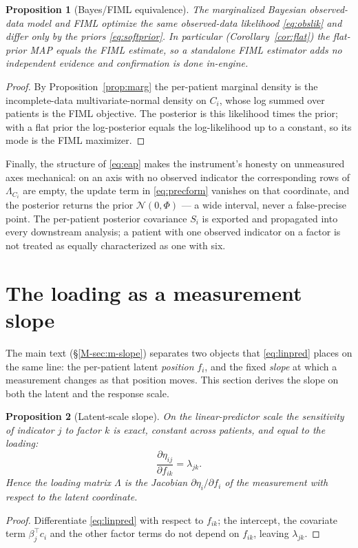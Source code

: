 \documentclass[11pt]{article}
\theoremstyle{plain}
\newtheorem{proposition}{Proposition}
\theoremstyle{definition}
\newcommand{\MSec}[1]{\S\ref{M-#1}}
\begin{document}
\begin{proposition}[Bayes/FIML equivalence]\label{prop:fiml}
The marginalized Bayesian observed-data model and FIML optimize the same observed-data
likelihood \eqref{eq:obslik} and differ only by the priors \eqref{eq:softprior}. In
particular (Corollary~\ref{cor:flat}) the flat-prior MAP equals the FIML estimate, so a
standalone FIML estimator adds no independent evidence and confirmation is done in-engine.
\end{proposition}
\begin{proof}
By Proposition~\ref{prop:marg} the per-patient marginal density is the incomplete-data
multivariate-normal density on $C_i$, whose log summed over patients is the FIML objective.
The posterior is this likelihood times the prior; with a flat prior the log-posterior equals
the log-likelihood up to a constant, so its mode is the FIML maximizer.
\end{proof}
\noindent
Finally, the structure of \eqref{eq:eap} makes the instrument's honesty on unmeasured axes
mechanical: on an axis with no observed indicator the corresponding rows of $\Lambda_{C_i}$
are empty, the update term in \eqref{eq:precform} vanishes on that coordinate, and the
posterior returns the prior $\mathcal N(0,\Phi)$ --- a wide interval, never a false-precise
point. The per-patient posterior covariance $S_i$ is exported and propagated into every
downstream analysis; a patient with one observed indicator on a factor is not treated as
equally characterized as one with six.

\section{The loading as a measurement slope}
\label{sec:slope}

The main text (\MSec{sec:m-slope}) separates two objects that \eqref{eq:linpred} places on
the same line: the per-patient latent \emph{position} $f_i$, and the fixed \emph{slope} at
which a measurement changes as that position moves. This section derives the slope on both
the latent and the response scale.

\begin{proposition}[Latent-scale slope]\label{prop:latslope}
On the linear-predictor scale the sensitivity of indicator $j$ to factor $k$ is exact,
constant across patients, and equal to the loading:
\begin{equation}
  \frac{\partial\eta_{ij}}{\partial f_{ik}}=\lambda_{jk}.
  \label{eq:latslope}
\end{equation}
Hence the loading matrix $\Lambda$ is the Jacobian $\partial\eta_i/\partial f_i$ of the
measurement with respect to the latent coordinate.
\end{proposition}
\begin{proof}
Differentiate \eqref{eq:linpred} with respect to $f_{ik}$; the intercept, the covariate
term $\beta_j^\top c_i$ and the other factor terms do not depend on $f_{ik}$, leaving
$\lambda_{jk}$.
\end{proof}
\end{document}
